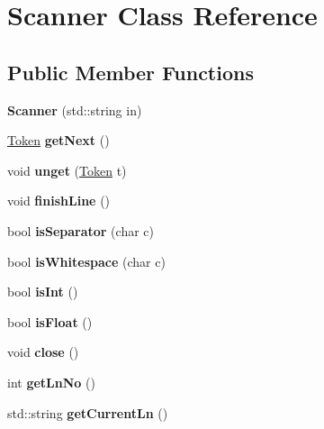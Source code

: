 \hypertarget{classScanner}{}\section{Scanner Class Reference}
\label{classScanner}
\subsection*{Public Member Functions}
\begin{DoxyCompactItemize}
\item 
\mbox{\label{classScanner_a627168541e621dc80b39d3b987ff57c4}} 
{\bfseries Scanner} (std\+::string in)
\item 
\mbox{\label{classScanner_a5876373ad6798a36388fb54b9996bdf0}} 
\hyperlink{structToken}{Token} {\bfseries get\+Next} ()
\item 
\mbox{\label{classScanner_aaaef33175f2f8e9796b9eb84c9bc9b52}} 
void {\bfseries unget} (\hyperlink{structToken}{Token} t)
\item 
\mbox{\label{classScanner_a7133343a7e2025d13f6f235d1711e869}} 
void {\bfseries finish\+Line} ()
\item 
\mbox{\label{classScanner_a909568ba92094a6104414d4191079341}} 
bool {\bfseries is\+Separator} (char c)
\item 
\mbox{\label{classScanner_a3d5b3a25d09cd034e26d702d0a7385de}} 
bool {\bfseries is\+Whitespace} (char c)
\item 
\mbox{\label{classScanner_a2df697740c520c95f8a3822d6e79957d}} 
bool {\bfseries is\+Int} ()
\item 
\mbox{\label{classScanner_a8519c211d841773a4bd15912ed7c4665}} 
bool {\bfseries is\+Float} ()
\item 
\mbox{\label{classScanner_a43891b58145721059c10ce3842f5d79d}} 
void {\bfseries close} ()
\item 
\mbox{\label{classScanner_aa7e72d1d8444446248a5e010c0422a9b}} 
int {\bfseries get\+Ln\+No} ()
\item 
\mbox{\label{classScanner_a514437c5e3fa46165c47e0790261ad5c}} 
std\+::string {\bfseries get\+Current\+Ln} ()
\end{DoxyCompactItemize}
